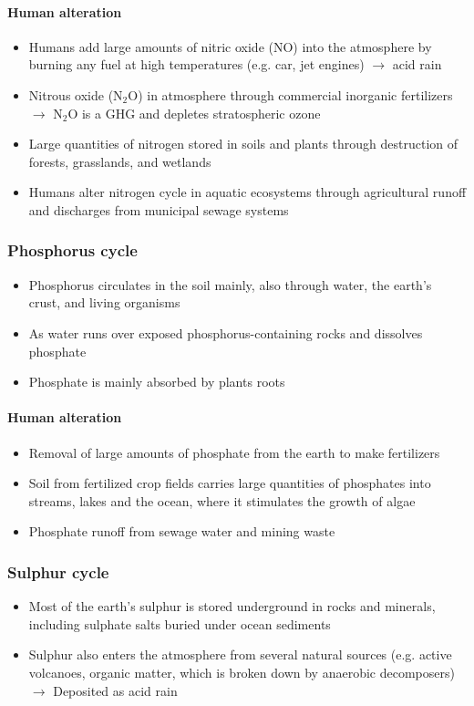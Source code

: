 \documentclass{article}
\begin{document}
\paragraph{Human alteration}
\begin{itemize}
    \item Humans add large amounts of nitric oxide (NO) into the atmosphere by burning any fuel at high temperatures (e.g. car, jet engines) $\rightarrow$ acid rain
    \item Nitrous oxide (N$_2$O) in atmosphere through commercial inorganic fertilizers $\rightarrow$ N$_2$O is a GHG and depletes stratospheric ozone
    \item Large quantities of nitrogen stored in soils and plants through destruction of forests, grasslands, and wetlands
    \item Humans alter nitrogen cycle in aquatic ecosystems through agricultural runoff and discharges from municipal sewage systems
\end{itemize}

\subsubsection{Phosphorus cycle}
\begin{itemize}
    \item Phosphorus circulates in the soil mainly, also through water, the earth's crust, and living organisms
    \item As water runs over exposed phosphorus-containing rocks and dissolves phosphate
    \item Phosphate is mainly absorbed by plants roots
\end{itemize}

\paragraph{Human alteration}
\begin{itemize}
    \item Removal of large amounts of phosphate from the earth to make fertilizers
    \item Soil from fertilized crop fields carries large quantities of phosphates into streams, lakes and the ocean, where it stimulates the growth of algae
    \item Phosphate runoff from sewage water and mining waste
\end{itemize}

\subsubsection{Sulphur cycle}
\begin{itemize}
    \item Most of the earth’s sulphur is stored underground in rocks and minerals, including sulphate salts buried under ocean sediments
    \item Sulphur also enters the atmosphere from several natural sources (e.g. active volcanoes, organic matter, which is broken down by anaerobic decomposers) $\rightarrow$ Deposited as acid rain
\end{itemize}
\end{document}
